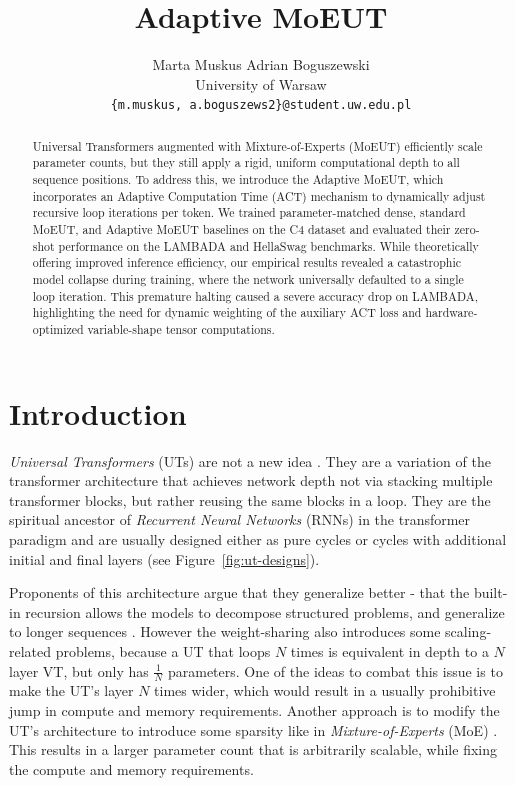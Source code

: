 \documentclass[11pt]{article}
\title{Adaptive MoEUT}
\author{Marta Muskus \quad Adrian Boguszewski \\
  University of Warsaw \\
  \texttt{\{m.muskus, a.boguszews2\}@student.uw.edu.pl}
}
\begin{document}
\maketitle
\begin{abstract}
Universal Transformers augmented with Mixture-of-Experts (MoEUT) efficiently scale parameter counts, but they still apply a rigid, uniform computational depth to all sequence positions. To address this, we introduce the Adaptive MoEUT, which incorporates an Adaptive Computation Time (ACT) mechanism to dynamically adjust recursive loop iterations per token. We trained parameter-matched dense, standard MoEUT, and Adaptive MoEUT baselines on the C4 dataset and evaluated their zero-shot performance on the LAMBADA and HellaSwag benchmarks. While theoretically offering improved inference efficiency, our empirical results revealed a catastrophic model collapse during training, where the network universally defaulted to a single loop iteration. This premature halting caused a severe accuracy drop on LAMBADA, highlighting the need for dynamic weighting of the auxiliary ACT loss and hardware-optimized variable-shape tensor computations.
\end{abstract}

\section{Introduction}
\textit{Universal Transformers} (UTs) are not a new idea \cite{ut}.
They are a variation of the transformer \cite{transformer} architecture that achieves network depth not via stacking multiple transformer blocks, but rather reusing the same blocks in a loop.
They are the spiritual ancestor of \textit{Recurrent Neural Networks} (RNNs) in the transformer paradigm and are usually designed either as pure cycles or cycles with additional initial and final layers (see Figure~\ref{fig:ut-designs}).

Proponents of this architecture argue that they generalize better - that the built-in recursion allows the models to decompose structured problems, and generalize to longer sequences \cite{moeut}.
However the weight-sharing also introduces some scaling-related problems, because a UT that loops $N$ times is equivalent in depth to a $N$ layer VT, but only has $\frac{1}{N}$ parameters.
One of the ideas to combat this issue is to make the UT's layer $N$ times wider, which would result in a usually prohibitive jump in compute and memory requirements.
Another approach is to modify the UT's architecture to introduce some sparsity like in \textit{Mixture-of-Experts} (MoE) \cite{moe}.
This results in a larger parameter count that is arbitrarily scalable, while fixing the compute and memory requirements.
\end{document}
